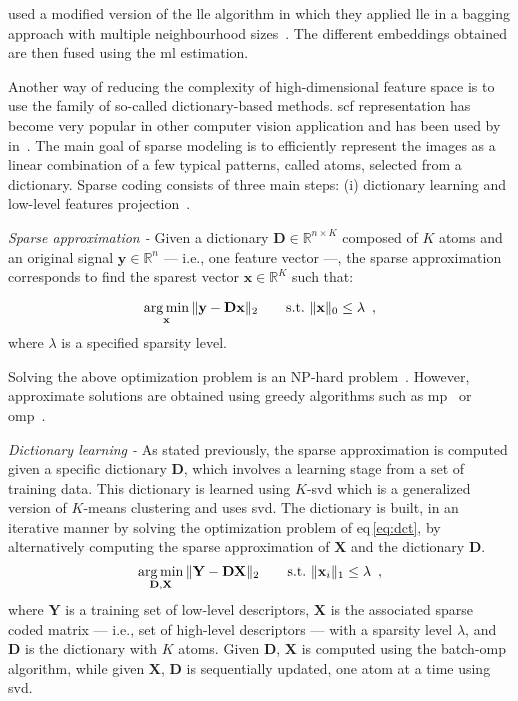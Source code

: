 \citeauthor{Tiwari2008} used a modified version of the \ac{lle} algorithm in which they applied \ac{lle} in a bagging approach with multiple neighbourhood sizes~\cite{Tiwari2008}.
The different embeddings obtained are then fused using the \ac{ml} estimation.

Another way of reducing the complexity of high-dimensional feature space is to use the family of so-called dictionary-based methods.
\Ac{scf} representation has become very popular in other computer vision application and has been used by \citeauthor{lehaire2014computer} in~\cite{lehaire2014computer}.
The main goal of sparse modeling is to efficiently represent the images as a linear combination of a few typical patterns, called atoms, selected from a dictionary.
Sparse coding consists of three main steps: (i) dictionary learning and low-level features projection~\cite{rubinstein2008efficient}.

\emph{Sparse approximation -} Given a dictionary $\mathbf{D} \in \mathbb{R}^{n \times K}$ composed of $K$ atoms and an original signal $\mathbf{y} \in \mathbb{R}^{n}$ --- i.e., one feature vector ---, the sparse approximation corresponds to find the sparest vector $\mathbf{x} \in \mathbb{R}^{K}$ such that:

\begin{equation}
  \operatorname*{arg\,min}_{\mathbf{x}}\|\mathbf{y - Dx} \|_{2} \qquad  \text{s.t.} \  \|\mathbf{x}\|_{0} \leq \lambda \, \label{eq:sprapp} \ ,
\end{equation}
\noindent where $\lambda$ is a specified sparsity level.

Solving the above optimization problem is an NP-hard problem~\cite{elad2010sparse}.
However, approximate solutions are obtained using greedy algorithms such as \ac{mp}~\cite{mallat1993matching} or \ac{omp}~\cite{pati1993orthogonal,davis1997adaptive}.

\emph{Dictionary learning -} As stated previously, the sparse approximation is computed given a specific dictionary $\mathbf{D}$, which involves a learning stage from a set of training data.
This dictionary is learned using $K$-\acs*{svd} which is a generalized version of $K$-means clustering and uses \ac{svd}. 
The dictionary is built, in an iterative manner by solving the optimization problem of \acs{eq}\,\eqref{eq:dct}, by alternatively computing the sparse approximation of $\mathbf{X}$ and the dictionary $\mathbf{D}$.
\begin{equation}
  \operatorname*{arg\,min}_{\mathbf{D,X}} \|\mathbf{Y} - \mathbf{D}\mathbf{X}\|_{2} \qquad  \text{s.t.} \  \|\mathbf{x}_{i}\|_{1} \leq \lambda \,\label{eq:dct} \ ,
\end{equation}
\noindent where $\mathbf{Y}$ is a training set of low-level descriptors, $\mathbf{X}$ is the associated sparse coded matrix --- i.e., set of high-level descriptors --- with a sparsity level $\lambda$, and $\mathbf{D}$ is the dictionary with $K$ atoms.
Given $\mathbf{D}$, $\mathbf{X}$ is computed using the batch-\ac{omp} algorithm, while given $\mathbf{X}$, $\mathbf{D}$ is sequentially updated, one atom at a time using \ac{svd}. 

